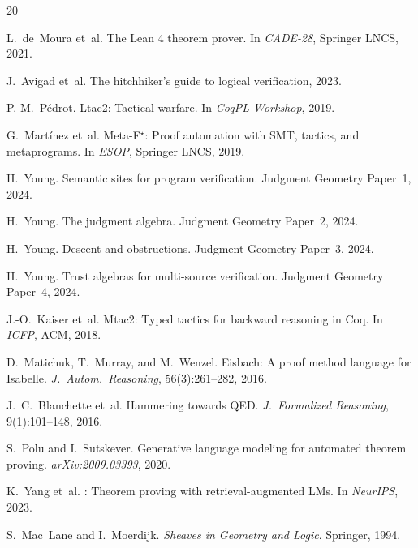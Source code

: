 \documentclass[11pt]{article}
\begin{document}
\begin{thebibliography}{20}

L.~de~Moura et~al.
\newblock The {Lean} 4 theorem prover.
\newblock In \emph{CADE-28}, Springer LNCS, 2021.

J.~Avigad et~al.
\newblock The hitchhiker's guide to logical verification, 2023.

P.-M.~P\'{e}drot.
\newblock Ltac2: Tactical warfare.
\newblock In \emph{CoqPL Workshop}, 2019.

G.~Mart\'{i}nez et~al.
\newblock Meta-{F}$^{\star}$: Proof automation with SMT, tactics,
and metaprograms.
\newblock In \emph{ESOP}, Springer LNCS, 2019.

H.~Young.
\newblock Semantic sites for program verification.
\newblock Judgment Geometry Paper~1, 2024.

H.~Young.
\newblock The judgment algebra.
\newblock Judgment Geometry Paper~2, 2024.

H.~Young.
\newblock Descent and obstructions.
\newblock Judgment Geometry Paper~3, 2024.

H.~Young.
\newblock Trust algebras for multi-source verification.
\newblock Judgment Geometry Paper~4, 2024.

J.-O.~Kaiser et~al.
\newblock Mtac2: Typed tactics for backward reasoning in {Coq}.
\newblock In \emph{ICFP}, ACM, 2018.

D.~Matichuk, T.~Murray, and M.~Wenzel.
\newblock Eisbach: A proof method language for {Isabelle}.
\newblock \emph{J.\ Autom.\ Reasoning}, 56(3):261--282, 2016.

J.~C.~Blanchette et~al.
\newblock Hammering towards {QED}.
\newblock \emph{J.\ Formalized Reasoning}, 9(1):101--148, 2016.

S.~Polu and I.~Sutskever.
\newblock Generative language modeling for automated theorem proving.
\newblock \emph{arXiv:2009.03393}, 2020.

K.~Yang et~al.
: Theorem proving with retrieval-augmented LMs.
\newblock In \emph{NeurIPS}, 2023.

S.~Mac~Lane and I.~Moerdijk.
\newblock \emph{Sheaves in Geometry and Logic}.
\newblock Springer, 1994.


\end{thebibliography}
\end{document}
